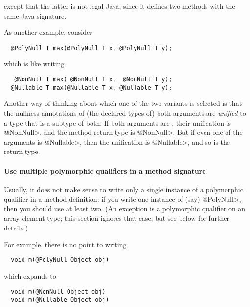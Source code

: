 \noindent
except that the latter is not legal Java, since it defines two
methods with the same Java signature.


As another example, consider

\begin{Verbatim}
  @PolyNull T max(@PolyNull T x, @PolyNull T y);
\end{Verbatim}

\noindent
which is like writing

\begin{Verbatim}
   @NonNull T max( @NonNull T x,  @NonNull T y);
  @Nullable T max(@Nullable T x, @Nullable T y);
\end{Verbatim}

\noindent
Another way of thinking about which one of the two  variants is
selected is that the nullness annotations of (the declared types of) both
arguments are \emph{unified} to a type that is a subtype of both.  If both
arguments are , their unification is \<@NonNull>, and the
method return type is \<@NonNull>.  But if even one of the arguments is \<@Nullable>,
then the unification is \<@Nullable>, and so is the return type.


\paragraph{Use multiple polymorphic qualifiers in a method signature\label{qualifier-polymorphism-multiple-qualifiers}}


Usually, it does not make sense to write only a single instance of a polymorphic
qualifier in a method definition:  if you write one instance of (say)
\<@PolyNull>, then you should use at least two.  (An exception is a
polymorphic qualifier on an array element type; this section ignores that
case, but see below for further details.)

For example, there is no point to writing

\begin{Verbatim}
  void m(@PolyNull Object obj)
\end{Verbatim}

\noindent
which expands to

\begin{Verbatim}
  void m(@NonNull Object obj)
  void m(@Nullable Object obj)
\end{Verbatim}

